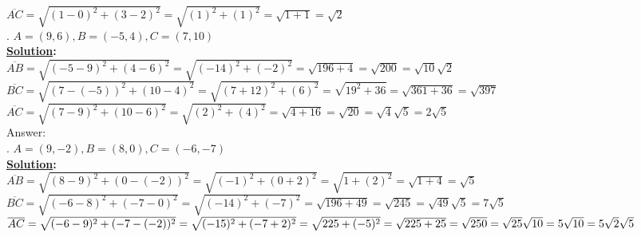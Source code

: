 \documentclass[10pt,letterpaper]{article}
\begin{document}
\newline $\overline{AC} =\sqrt{(1-0)^2+(3-2)^2}=\sqrt{(1)^2+(1)^2}=\sqrt{1+1}=\sqrt{2}$\\
. $A=(9, 6), B=(-5, 4), C=(7, 10)$\\
\textbf{\underline {Solution}:}\\
\newline $\overline{AB} =\sqrt{(-5-9)^2+(4-6)^2}=\sqrt{(-14)^2+(-2)^2}=\sqrt{196+4}=\sqrt{200}=\sqrt{10}\sqrt{2}$
\newline $\overline{BC} =\sqrt{(7-(-5))^2+(10-4)^2}=\sqrt{(7+12)^2+(6)^2}=\sqrt{19^2+36}=\sqrt{361+36}=\sqrt{397}$
\newline $\overline{AC} =\sqrt{(7-9)^2+(10-6)^2}=\sqrt{(2)^2+(4)^2}=\sqrt{4+16}=\sqrt{20}=\sqrt{4}\sqrt{5}=2\sqrt{5}$\\
\newline Answer: \color{green}{Right Triangle}\color{black}\\
. $A=(9, -2), B=(8, 0), C=(-6, -7)$\\
\textbf{\underline {Solution}:}\\
\newline $\overline{AB} =\sqrt{(8-9)^2+(0-(-2))^2}=\sqrt{(-1)^2+(0+2)^2}=\sqrt{1+(2)^2}=\sqrt{1+4}=\sqrt{5}$
\newline $\overline{BC} =\sqrt{(-6-8)^2+(-7-0)^2}=\sqrt{(-14)^2+(-7)^2}=\sqrt{196+49}=\sqrt{245}=\sqrt{49}\sqrt{5}=7\sqrt{5}$
\newline $\overline{AC} =\sqrt{(-6-9)^2+(-7-(-2))^2}=\sqrt{(-15)^2+(-7+2)^2}=\sqrt{225+(-5)^2}=\sqrt{225+25}=\sqrt{250}\\=\sqrt{25}\sqrt{10}=5\sqrt{10}=5\sqrt{2}\sqrt{5}$
\\
\end{document}
